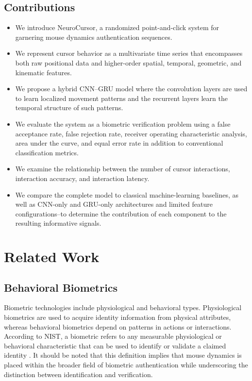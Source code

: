 \documentclass[conference]{IEEEtran}
\begin{document}
\subsection{Contributions}
\begin{itemize}
    \item We introduce NeuroCursor, a randomized point-and-click system for garnering mouse dynamics authentication sequences. 

    \item We represent cursor behavior as a multivariate time series that encompasses both raw positional data and higher-order spatial, temporal, geometric, and kinematic features. 

    \item We propose a hybrid CNN--GRU model where the convolution layers are used to learn localized movement patterns and the recurrent layers learn the temporal structure of such patterns. 

    \item We evaluate the system as a biometric verification problem using a false acceptance rate, false rejection rate, receiver operating characteristic analysis, area under the curve, and equal error rate in addition to conventional classification metrics. 

    \item We examine the relationship between the number of cursor interactions, interaction accuracy, and interaction latency. 

    \item We compare the complete model to classical machine-learning baselines, as well as CNN-only and GRU-only architectures and limited feature configurations--to determine the contribution of each component to the resulting informative signals. 
\end{itemize}

\section{Related Work}
\subsection{Behavioral Biometrics}

Biometric technologies include physiological and behavioral types. Physiological biometrics are used to acquire identity information from physical attributes, whereas behavioral biometrics depend on patterns in actions or interactions. According to NIST, a biometric refers to any measurable physiological or behavioral characteristic that can be used to identify or validate a claimed identity \cite{nistBiometrics}. It should be noted that this definition implies that mouse dynamics is placed within the broader field of biometric authentication while underscoring the distinction between identification and verification. 
\end{document}
